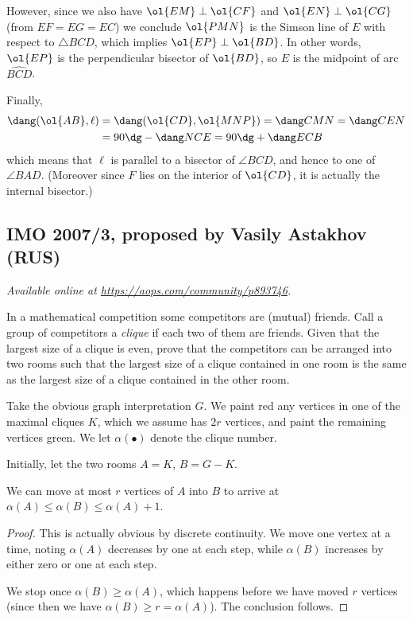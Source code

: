 \documentclass[11pt]{scrartcl}
\begin{document}
However, since we also have $\ol{EM} \perp \ol{CF}$
and $\ol{EN} \perp \ol{CG}$ (from $EF=EG=EC$)
we conclude $\ol{PMN}$ is the Simson line of $E$ with respect to $\triangle BCD$,
which implies $\ol{EP} \perp \ol{BD}$.
In other words, $\ol{EP}$ is the perpendicular bisector of $\ol{BD}$,
so $E$ is the midpoint of arc $\widehat{BCD}$.

Finally,
\begin{align*}
  \dang(\ol{AB}, \ell) &= \dang(\ol{CD}, \ol{MNP}) = \dang CMN = \dang CEN \\
  &= 90\dg - \dang NCE = 90\dg + \dang ECB
\end{align*}
which means that $\ell$ is parallel to a bisector of $\angle BCD$,
and hence to one of $\angle BAD$.
(Moreover since $F$ lies on the interior of $\ol{CD}$,
it is actually the internal bisector.)
\pagebreak

\subsection{IMO 2007/3, proposed by Vasily Astakhov (RUS)}
\textsl{Available online at \url{https://aops.com/community/p893746}.}
\begin{mdframed}[style=mdpurplebox,frametitle={Problem statement}]
In a mathematical competition some competitors are (mutual) friends.
Call a group of competitors a \emph{clique} if each two of them are friends.
Given that the largest size of a clique is even,
prove that the competitors can be arranged into two rooms
such that the largest size of a clique contained in one room
is the same as the largest size of a clique contained in the other room.
\end{mdframed}
Take the obvious graph interpretation $G$.
We paint red any vertices in one of the maximal cliques $K$,
which we assume has $2r$ vertices,
and paint the remaining vertices green.
We let $\alpha(\bullet)$ denote the clique number.

Initially, let the two rooms $A = K$, $B = G-K$.
\begin{claim*}
  We can move at most $r$ vertices of $A$ into $B$
  to arrive at $\alpha(A) \le \alpha(B) \le \alpha(A)+1$.
\end{claim*}
\begin{proof}
  This is actually obvious by discrete continuity.
  We move one vertex at a time,
  noting $\alpha(A)$ decreases by one at each step,
  while $\alpha(B)$ increases by either zero or one at each step.

  We stop once $\alpha(B) \ge \alpha(A)$,
  which happens before we have moved $r$ vertices
  (since then we have $\alpha(B) \ge r = \alpha(A)$).
  The conclusion follows.
\end{proof}
\end{document}
